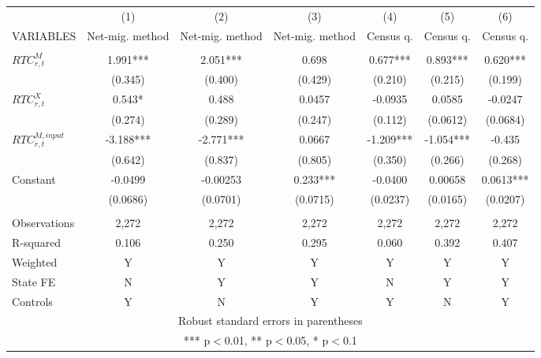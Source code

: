 \begin{tabular}{lcccccc} \hline
 & (1) & (2) & (3) & (4) & (5) & (6) \\
VARIABLES & Net-mig. method & Net-mig. method & Net-mig. method & Census q. & Census q. & Census q. \\ \hline
 &  &  &  &  &  &  \\
$ RTC_{r,t}^M$ & 1.991*** & 2.051*** & 0.698 & 0.677*** & 0.893*** & 0.620*** \\
 & (0.345) & (0.400) & (0.429) & (0.210) & (0.215) & (0.199) \\
$ RTC_{r,t}^X$ & 0.543* & 0.488 & 0.0457 & -0.0935 & 0.0585 & -0.0247 \\
 & (0.274) & (0.289) & (0.247) & (0.112) & (0.0612) & (0.0684) \\
$ RTC_{r,t}^{M,input}$ & -3.188*** & -2.771*** & 0.0667 & -1.209*** & -1.054*** & -0.435 \\
 & (0.642) & (0.837) & (0.805) & (0.350) & (0.266) & (0.268) \\
Constant & -0.0499 & -0.00253 & 0.233*** & -0.0400 & 0.00658 & 0.0613*** \\
 & (0.0686) & (0.0701) & (0.0715) & (0.0237) & (0.0165) & (0.0207) \\
 &  &  &  &  &  &  \\
Observations & 2,272 & 2,272 & 2,272 & 2,272 & 2,272 & 2,272 \\
R-squared & 0.106 & 0.250 & 0.295 & 0.060 & 0.392 & 0.407 \\
Weighted & Y & Y & Y & Y & Y & Y \\
State FE & N & Y & Y & N & Y & Y \\
 Controls & Y & N & Y & Y & N & Y \\ \hline
\multicolumn{7}{c}{ Robust standard errors in parentheses} \\
\multicolumn{7}{c}{ *** p$<$0.01, ** p$<$0.05, * p$<$0.1} \\
\end{tabular}
